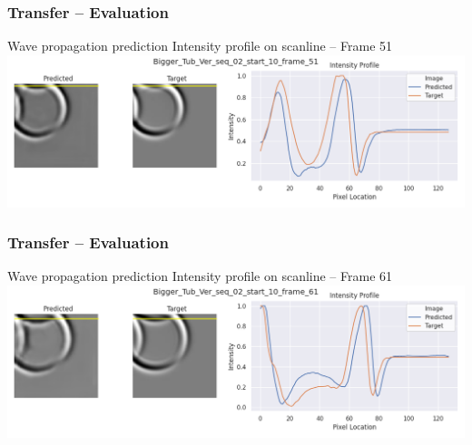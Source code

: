 \clearpage
\begin{frame}
    \frametitle{Transfer -- Evaluation}

Wave propagation prediction \newline
Intensity profile on scanline -- Frame 51\\[\baselineskip]

\includegraphics[width=\textwidth, height=.55\textheight]{./Ressourcen/Praesentation/Bilder/WaveTransfer/DFP/Bigger_Tub_Ver_seq_02_start_10_frame_51.png}%

\end{frame}
\clearpage
\begin{frame}
    \frametitle{Transfer -- Evaluation}

Wave propagation prediction \newline
Intensity profile on scanline -- Frame 61\\[\baselineskip]

\includegraphics[width=\textwidth, height=.55\textheight]{./Ressourcen/Praesentation/Bilder/WaveTransfer/DFP/Bigger_Tub_Ver_seq_02_start_10_frame_61.png}%

\end{frame}
\clearpage
